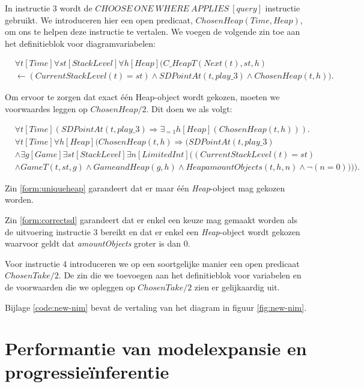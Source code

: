 In instructie 3 wordt de $CHOOSE\ ONE\ WHERE\ APPLIES\ [query]$ instructie gebruikt. We introduceren hier een open predicaat, $ChosenHeap(Time, Heap)$, om ons te helpen deze instructie te vertalen. We voegen de volgende zin toe aan het definitieblok voor diagramvariabelen:

\begin{align}
\nonumber &\forall{t}[Time]\forall{st}[StackLevel]\forall{h}[Heap](C\_HeapT(Next(t), st, h) \\ &\leftarrow (CurrentStackLevel(t) = st) \land SDPointAt(t, play\_3) \land ChosenHeap(t, h)).
\end{align}

Om ervoor te zorgen dat exact \'e\'en Heap-object wordt gekozen, moeten we voorwaardes leggen op $ChosenHeap/2$. Dit doen we als volgt:

\begin{align}
&\forall{t}[Time](SDPointAt(t, play\_3) \Rightarrow \exists_{=1}{h}[Heap](ChosenHeap(t, h))).\label{form:uniqueheap} \\
\nonumber &\forall{t}[Time]\forall{h}[Heap](ChosenHeap(t, h) \Rightarrow (SDPointAt(t, play\_3) \\ \nonumber &\land \exists{g}[Game]\exists{st}[StackLevel]\exists{n}[LimitedInt]((CurrentStackLevel(t) = st) \\ &\land GameT(t, st, g) \land GameandHeap(g, h) \land HeapamountObjects(t, h, n) \land \lnot(n = 0)))).\label{form:correctsd}
\end{align}

Zin \ref{form:uniqueheap} garandeert dat er maar \'e\'en \textit{Heap}-object mag gekozen worden.

Zin \ref{form:correctsd} garandeert dat er enkel een keuze mag gemaakt worden als de uitvoering instructie 3 bereikt en dat er enkel een \textit{Heap}-object wordt gekozen waarvoor geldt dat \textit{amountObjects} groter is dan 0.

Voor instructie 4 introduceren we op een soortgelijke manier een open predicaat $ChosenTake/2$. De zin die we toevoegen aan het definitieblok voor variabelen en de voorwaarden die we opleggen op $ChosenTake/2$ zien er gelijkaardig uit.

Bijlage \ref{code:new-nim} bevat de vertaling van het diagram in figuur \ref{fig:new-nim}.

\section{Performantie van modelexpansie en progressie\"inferentie}\label{sec:dec-performance}

